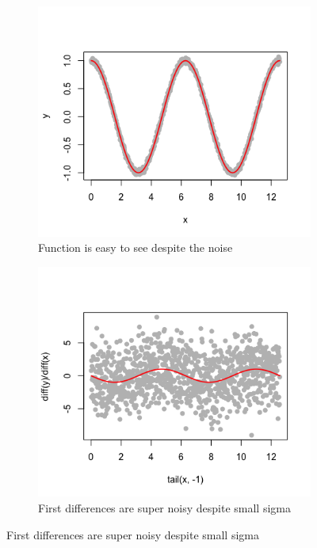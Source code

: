 \documentclass[11 pt]{article}
\begin{document}
\begin{figure}[H]
	\begin{center}
		\begin{subfigure}[h]{0.35\linewidth}
			\includegraphics[width=\linewidth]{R_Code/Fig/P1F1.png}
			\caption{Function is easy to see despite the noise}
		\end{subfigure}
		\begin{subfigure}[h]{0.35\linewidth}
			\includegraphics[width=\linewidth]{R_Code/Fig/P1F2.png}
			\caption{First differences are super noisy despite small sigma}

\end{subfigure}
\end{center}
\end{figure}
\end{document}
